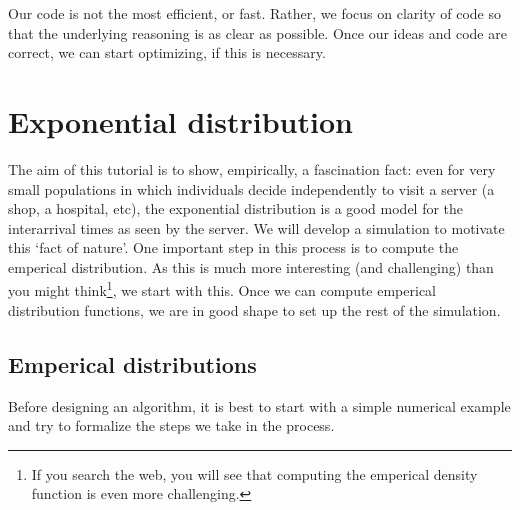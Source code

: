 \documentclass{scrartcl}
\begin{document}
Our code is not the most efficient, or fast. Rather, we focus on clarity of code so that the underlying reasoning is as clear as possible. Once our ideas and code are correct, we can start optimizing, if this is necessary. 

\section{Exponential distribution}

The aim of this tutorial is to show, empirically, a fascination fact: even for very small populations in which individuals decide independently to visit a server (a shop, a hospital, etc),  the  exponential distribution is a good model for the interarrival times as seen by the server.  We will develop a simulation to motivate this `fact of nature'.  One important step in this process is to compute the emperical distribution. As this is much more interesting (and challenging) than you might think\footnote{If you search the web, you will see that computing the emperical density function is even more challenging.}, we start with this. Once we can compute emperical distribution functions, we are in good shape to set up the rest of the simulation. 

\subsection{Emperical distributions}
\label{sec:emper-distr}

Before designing an algorithm, it is best to start with a simple numerical example and try to formalize the steps we take in the process.
\end{document}
